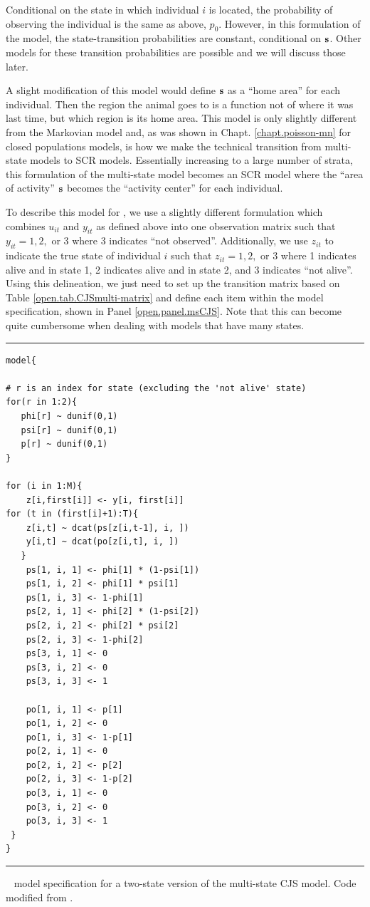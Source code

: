 Conditional on the state in which individual $i$ is located, the probability
of observing the individual is the same as above, $p_{0}$.  However, in this 
formulation of the model, the state-transition
probabilities are constant, conditional on ${\bf s}$.
Other models for these transition probabilities
are possible and we will discuss those later.

A slight modification of this model would define ${\bf s}$  as a
``home area'' 
for each individual. Then the region the animal goes to is a function
not of where it was last time, but which region is its home area.
This model is only slightly different from the Markovian model and, as
was shown in Chapt. \ref{chapt.poisson-mn} for closed populations
models, is how we make the technical transition from multi-state models
to SCR models.  Essentially increasing to a large number of strata,
this formulation of the multi-state model becomes an SCR model where
the ``area of activity'' ${\bf s}$ becomes the ``activity center'' for
each individual.

To describe this model for \jags, we use a slightly different
formulation which combines $u_{it}$ and $y_{it}$ as
defined above into one observation matrix such that $y_{it} = 1, 2,$
or $3$ where 3 indicates ``not observed''.  Additionally, we use
$z_{it}$ to indicate the true state of individual $i$ such that
$z_{it} = 1, 2,$ or $3$ where 1 indicates alive and in state 1, 2
indicates alive and in state 2, and 3 indicates ``not alive''.  Using
this delineation, we just need to set up the transition matrix based
on Table \ref{open.tab.CJSmulti-matrix} and define each item within
the model specification, shown in Panel \ref{open.panel.msCJS}.  Note
that this can become quite cumbersome when dealing with models that
have many states.


\begin{panel}[htp]
\centering
\rule[0.1in]{\textwidth}{.03in}
{\small
\begin{verbatim}
model{

# r is an index for state (excluding the 'not alive' state)
for(r in 1:2){
   phi[r] ~ dunif(0,1)
   psi[r] ~ dunif(0,1)
   p[r] ~ dunif(0,1)
}    

for (i in 1:M){
    z[i,first[i]] <- y[i, first[i]]
for (t in (first[i]+1):T){
    z[i,t] ~ dcat(ps[z[i,t-1], i, ])
    y[i,t] ~ dcat(po[z[i,t], i, ])
   }
	ps[1, i, 1] <- phi[1] * (1-psi[1])
	ps[1, i, 2] <- phi[1] * psi[1]
	ps[1, i, 3] <- 1-phi[1]
	ps[2, i, 1] <- phi[2] * (1-psi[2])
	ps[2, i, 2] <- phi[2] * psi[2]
	ps[2, i, 3] <- 1-phi[2]
	ps[3, i, 1] <- 0
	ps[3, i, 2] <- 0
	ps[3, i, 3] <- 1

	po[1, i, 1] <- p[1]
	po[1, i, 2] <- 0
	po[1, i, 3] <- 1-p[1]
	po[2, i, 1] <- 0
	po[2, i, 2] <- p[2]
	po[2, i, 3] <- 1-p[2]
	po[3, i, 1] <- 0
	po[3, i, 2] <- 0
	po[3, i, 3] <- 1
 }
}
\end{verbatim}
}
\rule[-0.1in]{\textwidth}{.03in}
\caption{
\jags~ model specification for a two-state version of the multi-state
CJS model. Code modified 
from \cite[][Chapt. 9]{kery_schaub:2011}. }
\label{open.panel.msCJS}
\end{panel}

